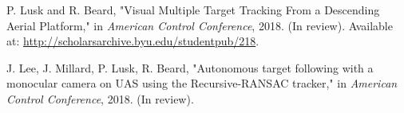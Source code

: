 

\renewcommand{\section}[2]{} %
\begin{thebibliography}{aa}

 P. Lusk and R. Beard, "Visual Multiple Target Tracking From a Descending Aerial Platform," in \textit{American Control Conference}, 2018. (In review). Available at: \url{http://scholarsarchive.byu.edu/studentpub/218}.

 J. Lee, J. Millard, P. Lusk, R. Beard, "Autonomous target following with a monocular camera on UAS using the Recursive-RANSAC tracker," in \textit{American Control Conference}, 2018. (In review).

\end{thebibliography}